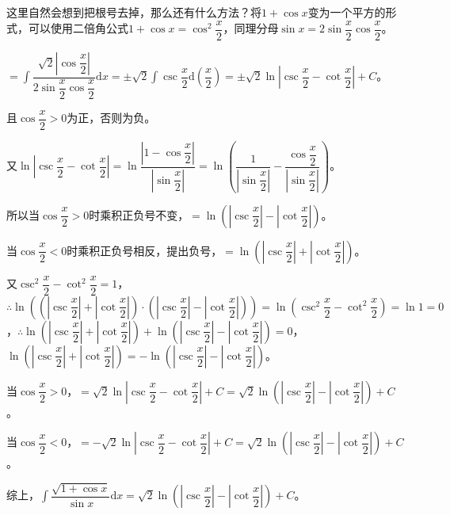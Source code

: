 \documentclass[UTF8, 12pt]{ctexart}
\begin{document}
这里自然会想到把根号去掉，那么还有什么方法？将$1+\cos x$变为一个平方的形式，可以使用二倍角公式$1+\cos x=\cos^2\dfrac{x}{2}$，同理分母$\sin x=2\sin\dfrac{x}{2}\cos\dfrac{x}{2}$。

$=\displaystyle{\int\dfrac{\sqrt{2}\left\vert\cos\dfrac{x}{2}\right\vert}{2\sin\dfrac{x}{2}\cos\dfrac{x}{2}}\textrm{d}x=\pm\sqrt{2}\int\csc\dfrac{x}{2}\textrm{d}\left(\dfrac{x}{2}\right)=\pm\sqrt{2}\ln\left\vert\csc\dfrac{x}{2}-\cot\dfrac{x}{2}\right\vert+C}$。

且$\cos\dfrac{x}{2}>0$为正，否则为负。

又$\ln\left\vert\csc\dfrac{x}{2}-\cot\dfrac{x}{2}\right\vert=\ln\dfrac{\left\vert1-\cos\dfrac{x}{2}\right\vert}{\left\vert\sin\dfrac{x}{2}\right\vert}=\ln\left(\dfrac{1}{\left\vert\sin\dfrac{x}{2}\right\vert}-\dfrac{\cos\dfrac{x}{2}}{\left\vert\sin\dfrac{x}{2}\right\vert}\right)$。\medskip

所以当$\cos\dfrac{x}{2}>0$时乘积正负号不变，$=\ln\left(\left\vert\csc\dfrac{x}{2}\right\vert-\left\vert\cot\dfrac{x}{2}\right\vert\right)$。

当$\cos\dfrac{x}{2}<0$时乘积正负号相反，提出负号，$=\ln\left(\left\vert\csc\dfrac{x}{2}\right\vert+\left\vert\cot\dfrac{x}{2}\right\vert\right)$。

又$\csc^2\dfrac{x}{2}-\cot^2\dfrac{x}{2}=1$，$\therefore\ln\left(\left(\left\vert\csc\dfrac{x}{2}\right\vert+\left\vert\cot\dfrac{x}{2}\right\vert\right)\cdot\left(\left\vert\csc\dfrac{x}{2}\right\vert-\left\vert\cot\dfrac{x}{2}\right\vert\right)\right)=\ln\left(\csc^2\dfrac{x}{2}-\cot^2\dfrac{x}{2}\right)=\ln1=0$，$\therefore\ln\left(\left\vert\csc\dfrac{x}{2}\right\vert+\left\vert\cot\dfrac{x}{2}\right\vert\right)+\ln\left(\left\vert\csc\dfrac{x}{2}\right\vert-\left\vert\cot\dfrac{x}{2}\right\vert\right)=0$，$\ln\left(\left\vert\csc\dfrac{x}{2}\right\vert+\left\vert\cot\dfrac{x}{2}\right\vert\right)=-\ln\left(\left\vert\csc\dfrac{x}{2}\right\vert-\left\vert\cot\dfrac{x}{2}\right\vert\right)$。

当$\cos\dfrac{x}{2}>0$，$=\sqrt{2}\ln\left\vert\csc\dfrac{x}{2}-\cot\dfrac{x}{2}\right\vert+C=\sqrt{2}\ln\left(\left\vert\csc\dfrac{x}{2}\right\vert-\left\vert\cot\dfrac{x}{2}\right\vert\right)+C$。

当$\cos\dfrac{x}{2}<0$，$=-\sqrt{2}\ln\left\vert\csc\dfrac{x}{2}-\cot\dfrac{x}{2}\right\vert+C=\sqrt{2}\ln\left(\left\vert\csc\dfrac{x}{2}\right\vert-\left\vert\cot\dfrac{x}{2}\right\vert\right)+C$。

综上，$\displaystyle{\int\dfrac{\sqrt{1+\cos x}}{\sin x}\textrm{d}x}=\sqrt{2}\ln\left(\left\vert\csc\dfrac{x}{2}\right\vert-\left\vert\cot\dfrac{x}{2}\right\vert\right)+C$。
\end{document}
